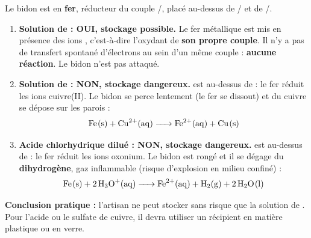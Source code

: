 \documentclass[11pt]{article}
\begin{document}
\begin{corrige}
Le bidon est en \textbf{fer}, réducteur du couple /, placé au-dessus de / et de /.

\begin{enumerate}
    \item \textbf{Solution de  : OUI, stockage possible.} Le fer métallique est mis en présence des ions , c'est-à-dire l'oxydant de \textbf{son propre couple}. Il n'y a pas de transfert spontané d'électrons au sein d'un même couple : \textbf{aucune réaction}. Le bidon n'est pas attaqué.
    \item \textbf{Solution de  : NON, stockage dangereux.}  est au-dessus de  : le fer réduit les ions cuivre(II). Le bidon se perce lentement (le fer se dissout) et du cuivre se dépose sur les parois :
    \[ \ce{Fe(s) + Cu^2+(aq) -> Fe^2+(aq) + Cu(s)} \]
    \item \textbf{Acide chlorhydrique dilué : NON, stockage dangereux.}  est au-dessus de  : le fer réduit les ions oxonium. Le bidon est rongé et il se dégage du \textbf{dihydrogène}, gaz inflammable (risque d'explosion en milieu confiné) :
    \[ \ce{Fe(s) + 2H3O+(aq) -> Fe^2+(aq) + H2(g) + 2H2O(l)} \]
\end{enumerate}
\textbf{Conclusion pratique :} l'artisan ne peut stocker sans risque que la solution de . Pour l'acide ou le sulfate de cuivre, il devra utiliser un récipient en matière plastique ou en verre.
\end{corrige}
\end{document}
